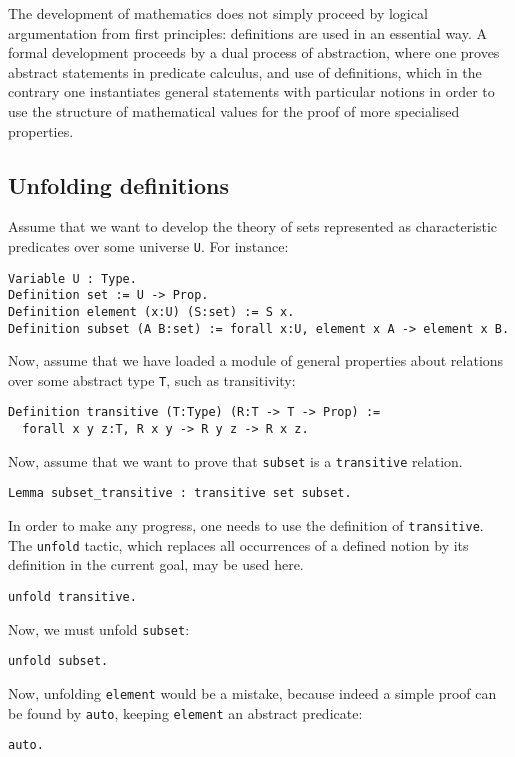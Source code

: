\documentclass{book}
\begin{document}
The development of mathematics does not simply proceed by logical 
argumentation from first principles: definitions are used in an essential way.
A formal development proceeds by a dual process of abstraction, where one
proves abstract statements in predicate calculus, and use of definitions, 
which in the contrary one instantiates general statements with particular 
notions in order to use the structure of mathematical values for the proof of
more specialised properties.

\subsection{Unfolding definitions}

Assume that we want to develop the theory of sets represented as characteristic
predicates over some universe \verb:U:. For instance:
\begin{lstlisting}
Variable U : Type.
Definition set := U -> Prop.
Definition element (x:U) (S:set) := S x.
Definition subset (A B:set) := forall x:U, element x A -> element x B.
\end{lstlisting}

Now, assume that we have loaded a module of general properties about
relations over some abstract type \verb:T:, such as transitivity:

\begin{lstlisting}
Definition transitive (T:Type) (R:T -> T -> Prop) :=
  forall x y z:T, R x y -> R y z -> R x z.
\end{lstlisting}

Now, assume that we want to prove that \verb:subset: is a \verb:transitive:
relation. 
\begin{lstlisting}
Lemma subset_transitive : transitive set subset.
\end{lstlisting}

In order to make any progress, one needs to use the definition of
\verb:transitive:. The \verb:unfold: tactic, which replaces all
occurrences of a defined notion by its definition in the current goal,
may be used here.
\begin{lstlisting}
unfold transitive.
\end{lstlisting}

Now, we must unfold \verb:subset::
\begin{lstlisting}
unfold subset.
\end{lstlisting}
Now, unfolding \verb:element: would be a mistake, because indeed a simple proof
can be found by \verb:auto:, keeping \verb:element: an abstract predicate:
\begin{lstlisting}
auto.
\end{lstlisting}
\end{document}
